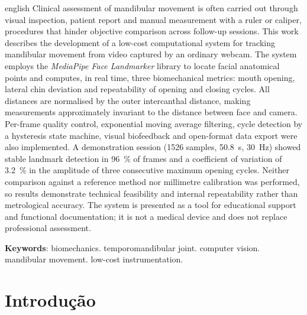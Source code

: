 \documentclass[
    article,
    11pt,
    oneside,
    a4paper,
    english,
    brazil
]{abntex2}
\begin{document}
\begin{resumoumacoluna}[Abstract]
\begin{otherlanguage*}{english}
Clinical assessment of mandibular movement is often carried out through
visual inspection, patient report and manual measurement with a ruler or
caliper, procedures that hinder objective comparison across follow-up
sessions. This work describes the development of a low-cost computational
system for tracking mandibular movement from video captured by an ordinary
webcam. The system employs the \textit{MediaPipe Face Landmarker} library to
locate facial anatomical points and computes, in real time, three
biomechanical metrics: mouth opening, lateral chin deviation and
repeatability of opening and closing cycles. All distances are normalised by
the outer intercanthal distance, making measurements approximately invariant
to the distance between face and camera. Per-frame quality control,
exponential moving average filtering, cycle detection by a hysteresis state
machine, visual biofeedback and open-format data export were also
implemented. A demonstration session (\num{1526} samples,
\SI{50.8}{\second}, \SI{30}{\hertz}) showed stable landmark detection in
\SI{96}{\percent} of frames and a coefficient of variation of
\SI{3.2}{\percent} in the amplitude of three consecutive maximum opening
cycles. Neither comparison against a reference method nor millimetre
calibration was performed, so results demonstrate technical feasibility and
internal repeatability rather than metrological accuracy. The system is
presented as a tool for educational support and functional documentation; it
is not a medical device and does not replace professional assessment.

\vspace{\onelineskip}

\noindent
\textbf{Keywords}: biomechanics. temporomandibular joint. computer vision.
mandibular movement. low-cost instrumentation.
\end{otherlanguage*}
\end{resumoumacoluna}

\textual

\section{Introdução}
\end{document}
